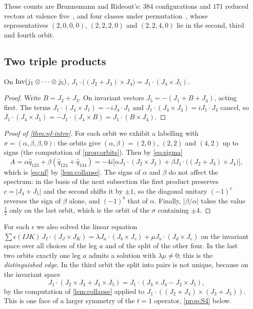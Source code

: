 These counts are Brunnemann and Rideout's: $384$ configurations and $171$ reduced
vectors at valence five~\cite[Table~1]{BR2008b}, and four classes under
permutation~\cite[Table~3]{BR2010}, whose representatives $(2,0,0,0)$, $(2,2,2,0)$ and
$(2,2,4,0)$ lie in the second, third and fourth orbit.

\subsection{Two triple products}

\begin{lemma}\label{lem:collapse}
On $\operatorname{Inv}(j_1\otimes\cdots\otimes j_5)$, $J_1\cdot\bigl((J_2+J_3)\times J_4\bigr)=
J_1\cdot(J_4\times J_5)$.
\end{lemma}

\begin{proof}
Write $B=J_2+J_3$. On invariant vectors $J_5=-(J_1+B+J_4)$, acting first. The terms
$J_1\cdot(J_4\times J_1)=-iJ_4\cdot J_1$ and $J_1\cdot(J_4\times J_4)=iJ_1\cdot J_4$
cancel, so $J_1\cdot(J_4\times J_5)=-J_1\cdot(J_4\times B)=J_1\cdot(B\times J_4)$.
\end{proof}

\begin{proof}[Proof of \cref{thm:nf-intro}]
For each orbit we exhibit a labelling with $\sigma=(\alpha,\beta,\beta,0)$: the orbits
give $(\alpha,\beta)=(2,0)$, $(2,2)$ and $(4,2)$ up to signs (the computation of
\cref{prop:orbits}). Then by \eqref{eq:sigma}
\[
  A=\alpha\hat q_{123}+\beta(\hat q_{124}+\hat q_{134})
   =-4i\bigl[\alpha J_1\cdot(J_2\times J_3)+\beta J_1\cdot\bigl((J_2+J_3)\times J_4\bigr)\bigr],
\]
which is \eqref{eq:nf} by \cref{lem:collapse}. The signs of $\alpha$ and $\beta$ do not
affect the spectrum: in the basis of the next subsection the first product preserves
$c=|J_4+J_5|$ and the second shifts it by $\pm1$, so the diagonal unitary $(-1)^c$
reverses the sign of $\beta$ alone, and $(-1)^b$ that of $\alpha$. Finally, $|\beta/\alpha|$
takes the value $\frac12$ only on the last orbit, which is the orbit of the $\sigma$
containing $\pm4$.
\end{proof}

For each $\epsilon$ we also solved the linear equation
$\sum\epsilon(IJK)\,J_I\cdot(J_J\times J_K)=\lambda J_a\cdot(J_b\times J_c)+\mu J_a\cdot
(J_d\times J_e)$ on the invariant space over all choices of the leg $a$ and of the
split of the other four. In the last two orbits exactly one leg $a$ admits a
solution with $\lambda\mu\ne0$; this is the \emph{distinguished edge}. In the third
orbit the split into pairs is not unique, because on the invariant space
\begin{equation}\label{eq:twosplits}
  J_1\cdot(J_2\times J_3+J_4\times J_5)=J_1\cdot(J_3\times J_4-J_2\times J_5),
\end{equation}
by the computation of \cref{lem:collapse} applied to
$J_1\cdot((J_2+J_4)\times(J_3+J_5))$. This is one face of a larger symmetry of the
$t=1$ operator, \cref{prop:S4} below.


